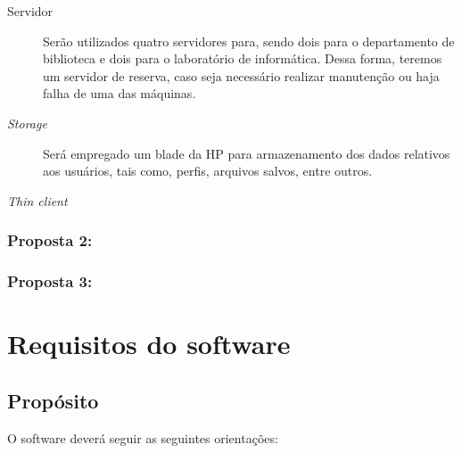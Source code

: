 \documentclass[a4paper,12pt]{report}
\begin{document}
            \begin{description}

                \item[Servidor] Serão utilizados quatro servidores para, sendo
                dois para o departamento de biblioteca e dois para o
                laboratório de informática. Dessa forma, teremos um servidor
                de reserva, caso seja necessário realizar manutenção ou
                haja falha de uma das máquinas.

                \item[\emph{Storage}] Será empregado um blade da HP para
                armazenamento dos dados relativos aos usuários, tais como,
                perfis, arquivos salvos, entre outros.

                \item[\emph{Thin client}]

            \end{description}

            \subsection{Proposta 2:}

            \subsection{Proposta 3:}

    \appendix
    \chapter{Requisitos do software}

        \section{Propósito}
        O software deverá seguir as seguintes orientações:
\end{document}
